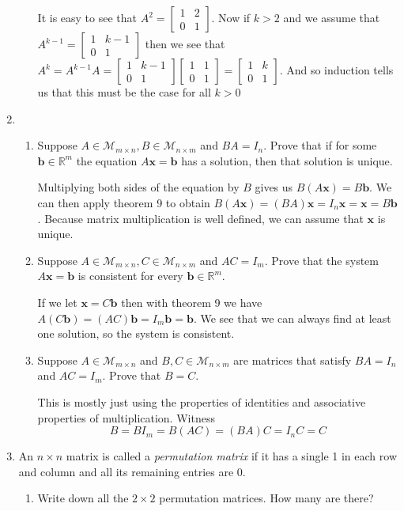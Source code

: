 \documentclass[letterpaper]{article}
\begin{document}
\begin{enumerate}
\begin{enumerate}
  It is easy to see that
  $A^2=\left[\begin{array}{cc}1&2\\0&1\end{array}\right]$.
  Now if $k>2$ and we assume that
  $A^{k-1}=\left[\begin{array}{cc}1&k-1\\0&1\end{array}\right]$
  then we see that $A^{k}=A^{k-1}A
  =\left[\begin{array}{cc}1&k-1\\0&1\end{array}\right]
  \left[\begin{array}{cc}1&1\\0&1\end{array}\right]
  =\left[\begin{array}{cc}1&k\\0&1\end{array}\right]$.
  And so induction tells us that this must be the case for all $k>0$
  \end{enumerate}
\setcounter{enumi}{10}
\item
  \begin{enumerate}
  \item
  Suppose $A\in \mathcal{M}_{m\times n},B\in \mathcal{M}_{n\times m}$ and $BA=I_n$. Prove that if for some $\mathbf{b}\in \mathbb{R}^m$ the equation $A\mathbf{x}=\mathbf{b}$ has a solution, then that solution is unique.

  Multiplying both sides of the equation by $B$ gives us $B(A\mathbf{x})=B\mathbf{b}$. We can then apply theorem 9 to obtain $B(A\mathbf{x})=(BA)\mathbf{x}=I _n\mathbf{x}=\mathbf{x}=B\mathbf{b}$. Because matrix multiplication is well defined, we can assume that $\mathbf{x}$ is unique.
  \item
  Suppose $A\in \mathcal{M}_{m\times n},C\in \mathcal{M}_{n\times m}$ and $AC=I_m$. Prove that the system $A\mathbf{x}=\mathbf{b}$ is consistent for every $\mathbf{b}\in \mathbb{R}^m$.

  If we let $\mathbf{x}=C\mathbf{b}$ then with theorem 9 we have $A(C\mathbf{b})=(AC)\mathbf{b}=I_m\mathbf{b}=\mathbf{b}$. We see that we can always find at least one solution, so the system is consistent.
  \item
  Suppose $A\in \mathcal{M}_{m\times n}$ and $B,C\in \mathcal{M}_{n\times m}$ are matrices that satisfy $BA=I_n$ and $AC=I_m$. Prove that $B=C$.

  This is mostly just using the properties of identities and associative properties of multiplication. Witness
\[B=BI_m=B(AC)=(BA)C=I_nC=C\]
  \end{enumerate}
\item
An $n\times n$ matrix is called a \emph{permutation matrix}  if it has a single 1 in each row and column and all its remaining entries are 0.
  \begin{enumerate}
  \item
  Write down all the $2\times 2$ permutation matrices. How many are there?


\end{enumerate}
\end{enumerate}
\end{document}
